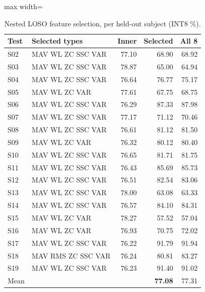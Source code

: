 \documentclass[11pt,a4paper]{article}
\begin{document}
\begin{table}[htbp]\centering\small
\caption{Nested LOSO feature selection, per held-out subject (INT8 \%).}\label{tab:featsel}
\begin{adjustbox}{max width=\linewidth}
\begin{tabular}{llrrr}\toprule
Test & Selected types & Inner & Selected & All 8\\\midrule
S02 & MAV WL ZC SSC VAR & 77.10 & 68.90 & 68.92\\
S03 & MAV WL ZC SSC VAR & 78.87 & 65.00 & 64.94\\
S04 & MAV WL ZC SSC VAR & 76.64 & 76.77 & 75.17\\
S05 & MAV WL ZC VAR & 77.61 & 67.75 & 68.75\\
S06 & MAV WL ZC SSC VAR & 76.29 & 87.33 & 87.98\\
S07 & MAV WL ZC SSC VAR & 77.17 & 71.12 & 70.46\\
S08 & MAV WL ZC SSC VAR & 76.61 & 81.12 & 81.50\\
S09 & MAV WL ZC VAR & 76.32 & 80.12 & 80.40\\
S10 & MAV WL ZC SSC VAR & 76.65 & 81.71 & 81.75\\
S11 & MAV WL ZC SSC VAR & 76.43 & 85.69 & 85.73\\
S12 & MAV WL ZC SSC VAR & 76.51 & 82.54 & 83.06\\
S13 & MAV WL ZC SSC VAR & 78.00 & 63.08 & 63.33\\
S14 & MAV WL ZC SSC VAR & 76.57 & 84.10 & 84.31\\
S15 & MAV WL ZC VAR & 78.27 & 57.52 & 57.04\\
S16 & MAV WL ZC VAR & 76.93 & 70.75 & 72.02\\
S17 & MAV WL ZC SSC VAR & 76.22 & 91.79 & 91.94\\
S18 & MAV RMS ZC SSC VAR & 76.24 & 80.81 & 83.27\\
S19 & MAV WL ZC SSC VAR & 76.23 & 91.40 & 91.02\\\midrule
Mean & & & \textbf{77.08} & 77.31\\\bottomrule
\end{tabular}\end{adjustbox}
\end{table}

\end{document}
